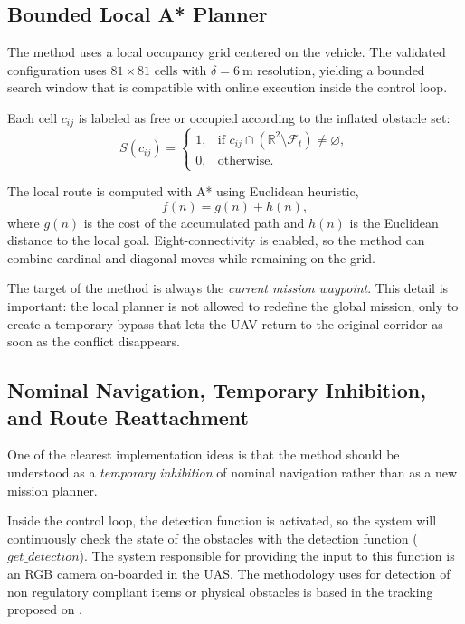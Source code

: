 \documentclass[a4paper,11pt]{article}
\begin{document}
\subsection{Bounded Local A* Planner}

The method uses a local occupancy grid centered on the vehicle. The validated configuration uses \(81 \times 81\) cells with \(\delta=\SI{6}{\meter}\) resolution, yielding a bounded search window that is compatible with online execution inside the control loop.

Each cell \(c_{ij}\) is labeled as free or occupied according to the inflated obstacle set:
\begin{equation}
    S(c_{ij}) =
    \begin{cases}
        1, & \text{if } c_{ij} \cap \left(\mathbb{R}^2 \setminus \mathcal{F}_t\right) \neq \varnothing,\\
        0, & \text{otherwise.}
    \end{cases}
\end{equation}

The local route is computed with A* \cite{hart1968formal} using Euclidean heuristic,
\begin{equation}
    f(n) = g(n) + h(n),
\end{equation}
where \(g(n)\) is the cost of the accumulated path and \(h(n)\) is the Euclidean distance to the local goal. Eight-connectivity is enabled, so the method can combine cardinal and diagonal moves while remaining on the grid.

The target of the method is always the \emph{current mission waypoint}. This detail is important: the local planner is not allowed to redefine the global mission, only to create a temporary bypass that lets the UAV return to the original corridor as soon as the conflict disappears.

\subsection{Nominal Navigation, Temporary Inhibition, and Route Reattachment}

One of the clearest implementation ideas is that the method should be understood as a \emph{temporary inhibition} of nominal navigation rather than as a new mission planner. 

Inside the control loop, the detection function is activated, so the system will continuously check the state of the obstacles with the detection function ($get\_detection$). The system responsible for providing the input to this function is an RGB camera on-boarded in the UAS. The methodology uses for detection of non regulatory compliant items or physical obstacles is based in the tracking proposed on \cite{alaez2023real}.
\end{document}
